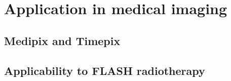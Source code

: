         

\section{Application in medical imaging}
    \subsection{Medipix and Timepix}
    \subsection{Applicability to FLASH radiotherapy}